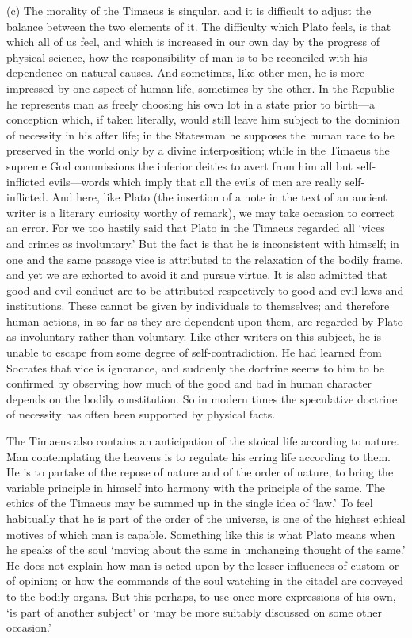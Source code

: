(c) The morality of the Timaeus is singular, and it is difficult to adjust
the balance between the two elements of it. The difficulty which Plato
feels, is that which all of us feel, and which is increased in our own day
by the progress of physical science, how the responsibility of man is to
be reconciled with his dependence on natural causes. And sometimes, like
other men, he is more impressed by one aspect of human life, sometimes by
the other. In the Republic he represents man as freely choosing his own
lot in a state prior to birth—a conception which, if taken
literally, would still leave him subject to the dominion of necessity in
his after life; in the Statesman he supposes the human race to be
preserved in the world only by a divine interposition; while in the
Timaeus the supreme God commissions the inferior deities to avert from him
all but self-inflicted evils—words which imply that all the evils of
men are really self-inflicted. And here, like Plato (the insertion of a
note in the text of an ancient writer is a literary curiosity worthy of
remark), we may take occasion to correct an error. For we too hastily said
that Plato in the Timaeus regarded all ‘vices and crimes as involuntary.’
But the fact is that he is inconsistent with himself; in one and the same
passage vice is attributed to the relaxation of the bodily frame, and yet
we are exhorted to avoid it and pursue virtue. It is also admitted that
good and evil conduct are to be attributed respectively to good and evil
laws and institutions. These cannot be given by individuals to themselves;
and therefore human actions, in so far as they are dependent upon them,
are regarded by Plato as involuntary rather than voluntary. Like other
writers on this subject, he is unable to escape from some degree of
self-contradiction. He had learned from Socrates that vice is ignorance,
and suddenly the doctrine seems to him to be confirmed by observing how
much of the good and bad in human character depends on the bodily
constitution. So in modern times the speculative doctrine of necessity has
often been supported by physical facts.

The Timaeus also contains an anticipation of the stoical life according to
nature. Man contemplating the heavens is to regulate his erring life
according to them. He is to partake of the repose of nature and of the
order of nature, to bring the variable principle in himself into harmony
with the principle of the same. The ethics of the Timaeus may be summed up
in the single idea of ‘law.’ To feel habitually that he is part of the
order of the universe, is one of the highest ethical motives of which man
is capable. Something like this is what Plato means when he speaks of the
soul ‘moving about the same in unchanging thought of the same.’ He does
not explain how man is acted upon by the lesser influences of custom or of
opinion; or how the commands of the soul watching in the citadel are
conveyed to the bodily organs. But this perhaps, to use once more
expressions of his own, ‘is part of another subject’ or ‘may be more
suitably discussed on some other occasion.’


